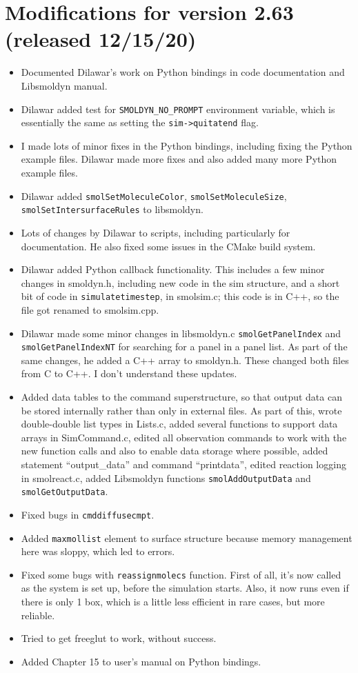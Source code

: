 \documentclass {scrbook}
\newcommand {\ttt} {\texttt}
\begin{document}
\section{Modifications for version 2.63 (released 12/15/20)}
\begin{itemize}
\item Documented Dilawar's work on Python bindings in code documentation and Libsmoldyn manual.
\item Dilawar added test for \ttt{SMOLDYN\_NO\_PROMPT} environment variable, which is essentially the same as setting the \ttt{sim->quitatend} flag.
\item I made lots of minor fixes in the Python bindings, including fixing the Python example files. Dilawar made more fixes and also added many more Python example files.
\item Dilawar added \ttt{smolSetMoleculeColor}, \ttt{smolSetMoleculeSize}, \ttt{smolSetIntersurfaceRules} to libsmoldyn.
\item Lots of changes by Dilawar to scripts, including particularly for documentation. He also fixed some issues in the CMake build system.
\item Dilawar added Python callback functionality. This includes a few minor changes in smoldyn.h, including new code in the sim structure, and a short bit of code in \ttt{simulatetimestep}, in smolsim.c; this code is in C++, so the file got renamed to smolsim.cpp.
\item Dilawar made some minor changes in libsmoldyn.c \ttt{smolGetPanelIndex} and \ttt{smolGetPanelIndexNT} for searching for a panel in a panel list. As part of the same changes, he added a C++ array to smoldyn.h. These changed both files from C to C++. I don't understand these updates.
\item Added data tables to the command superstructure, so that output data can be stored internally rather than only in external files. As part of this, wrote double-double list types in Lists.c, added several functions to support data arrays in SimCommand.c, edited all observation commands to work with the new function calls and also to enable data storage where possible, added statement ``output\_data'' and command ``printdata'', edited reaction logging in smolreact.c, added Libsmoldyn functions \ttt{smolAddOutputData} and \ttt{smolGetOutputData}.
\item Fixed bugs in \ttt{cmddiffusecmpt}.
\item Added \ttt{maxmollist} element to surface structure because memory management here was sloppy, which led to errors.
\item Fixed some bugs with \ttt{reassignmolecs} function. First of all, it's now called as the system is set up, before the simulation starts. Also, it now runs even if there is only 1 box, which is a little less efficient in rare cases, but more reliable.
\item Tried to get freeglut to work, without success.
\item Added Chapter 15 to user's manual on Python bindings.
\end{itemize}
\end{document}
